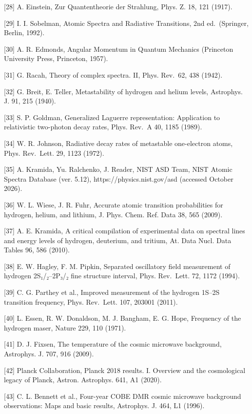 \documentclass[
  a4paper,
]{article}
\begin{document}
{[}28{]} A. Einstein, Zur Quantentheorie der Strahlung, Phys. Z. 18, 121
(1917).

{[}29{]} I. I. Sobelman, Atomic Spectra and Radiative Transitions, 2nd
ed.~(Springer, Berlin, 1992).

{[}30{]} A. R. Edmonds, Angular Momentum in Quantum Mechanics (Princeton
University Press, Princeton, 1957).

{[}31{]} G. Racah, Theory of complex spectra. II, Phys. Rev.~62, 438
(1942).

{[}32{]} G. Breit, E. Teller, Metastability of hydrogen and helium
levels, Astrophys. J. 91, 215 (1940).

{[}33{]} S. P. Goldman, Generalized Laguerre representation: Application
to relativistic two-photon decay rates, Phys. Rev.~A 40, 1185 (1989).

{[}34{]} W. R. Johnson, Radiative decay rates of metastable one-electron
atoms, Phys. Rev.~Lett. 29, 1123 (1972).

{[}35{]} A. Kramida, Yu. Ralchenko, J. Reader, NIST ASD Team, NIST
Atomic Spectra Database (ver. 5.12), https://physics.nist.gov/asd
(accessed October 2026).

{[}36{]} W. L. Wiese, J. R. Fuhr, Accurate atomic transition
probabilities for hydrogen, helium, and lithium, J. Phys. Chem. Ref.
Data 38, 565 (2009).

{[}37{]} A. E. Kramida, A critical compilation of experimental data on
spectral lines and energy levels of hydrogen, deuterium, and tritium,
At. Data Nucl. Data Tables 96, 586 (2010).

{[}38{]} E. W. Hagley, F. M. Pipkin, Separated oscillatory field
measurement of hydrogen 2S₁/₂--2P₃/₂ fine structure interval, Phys.
Rev.~Lett. 72, 1172 (1994).

{[}39{]} C. G. Parthey et al., Improved measurement of the hydrogen
1S--2S transition frequency, Phys. Rev.~Lett. 107, 203001 (2011).

{[}40{]} L. Essen, R. W. Donaldson, M. J. Bangham, E. G. Hope, Frequency
of the hydrogen maser, Nature 229, 110 (1971).

{[}41{]} D. J. Fixsen, The temperature of the cosmic microwave
background, Astrophys. J. 707, 916 (2009).

{[}42{]} Planck Collaboration, Planck 2018 results. I. Overview and the
cosmological legacy of Planck, Astron. Astrophys. 641, A1 (2020).

{[}43{]} C. L. Bennett et al., Four-year COBE DMR cosmic microwave
background observations: Maps and basic results, Astrophys. J. 464, L1
(1996).
\end{document}
